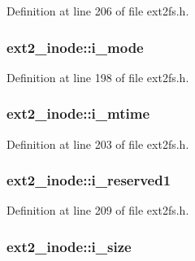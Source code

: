 \-Definition at line 206 of file ext2fs.\-h.

\hypertarget{structext2__inode_ab18d6b6ddb4d36a2faff527b43241126}{
\subsubsection[{i\-\_\-mode}]{ {\bf ext2\-\_\-inode\-::i\-\_\-mode}}}\label{structext2__inode_ab18d6b6ddb4d36a2faff527b43241126}


\-Definition at line 198 of file ext2fs.\-h.

\hypertarget{structext2__inode_a7eb44698eabf570fee0e65d22cc5fbd1}{
\subsubsection[{i\-\_\-mtime}]{ {\bf ext2\-\_\-inode\-::i\-\_\-mtime}}}\label{structext2__inode_a7eb44698eabf570fee0e65d22cc5fbd1}


\-Definition at line 203 of file ext2fs.\-h.

\hypertarget{structext2__inode_a39995c6a9fd3ee35e5ca9c24d21ea75a}{
\subsubsection[{i\-\_\-reserved1}]{ {\bf ext2\-\_\-inode\-::i\-\_\-reserved1}}}\label{structext2__inode_a39995c6a9fd3ee35e5ca9c24d21ea75a}


\-Definition at line 209 of file ext2fs.\-h.

\hypertarget{structext2__inode_a2b9e2a1c732aa02b5dead0948fb47c72}{
\subsubsection[{i\-\_\-size}]{ {\bf ext2\-\_\-inode\-::i\-\_\-size}}}\label{structext2__inode_a2b9e2a1c732aa02b5dead0948fb47c72}


